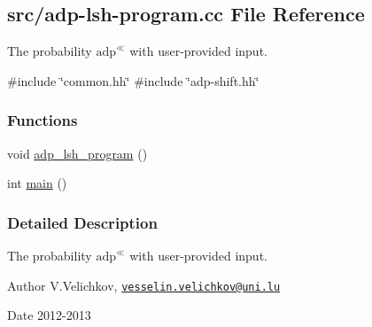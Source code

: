 \hypertarget{adp-lsh-program_8cc}{\subsection{src/adp-\/lsh-\/program.cc \-File \-Reference}
\label{adp-lsh-program_8cc}
}


\-The probability $\mathrm{adp}^{\ll}$ with user-\/provided input.  


{\ttfamily \#include \char`\"{}common.\-hh\char`\"{}}\*
{\ttfamily \#include \char`\"{}adp-\/shift.\-hh\char`\"{}}\*
\subsubsection*{\-Functions}
\begin{DoxyCompactItemize}
\item 
void \hyperlink{adp-lsh-program_8cc_ac80ff5b97301e9f4003c73f312b82e35}{adp\-\_\-lsh\-\_\-program} ()
\item 
int \hyperlink{adp-lsh-program_8cc_ae66f6b31b5ad750f1fe042a706a4e3d4}{main} ()
\end{DoxyCompactItemize}


\subsubsection{\-Detailed \-Description}
\-The probability $\mathrm{adp}^{\ll}$ with user-\/provided input. \begin{DoxyAuthor}{\-Author}
\-V.\-Velichkov, \href{mailto:vesselin.velichkov@uni.lu}{\tt vesselin.\-velichkov@uni.\-lu} 
\end{DoxyAuthor}
\begin{DoxyDate}{\-Date}
2012-\/2013 
\end{DoxyDate}


